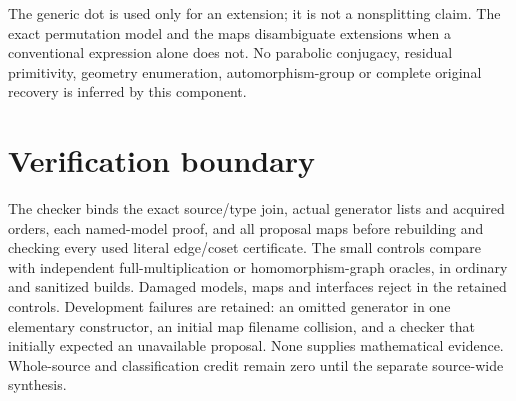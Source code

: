 \documentclass[10pt,a4paper]{article}
\begin{document}
The generic dot is used only for an extension; it is not a nonsplitting
claim. The exact permutation model and the maps disambiguate extensions
when a conventional expression alone does not. No parabolic conjugacy,
residual primitivity, geometry enumeration, automorphism-group or complete
original recovery is inferred by this component.

\section*{Verification boundary}
The checker binds the exact source/type join, actual generator
lists and acquired orders, each named-model proof, and all proposal maps
before rebuilding and checking every used literal edge/coset certificate.
The small controls compare with independent full-multiplication or
homomorphism-graph oracles, in ordinary and sanitized builds. Damaged
models, maps and interfaces reject in the retained controls. Development failures are retained:
an omitted generator in one elementary constructor, an initial map filename
collision, and a checker that initially expected an unavailable proposal.
None supplies mathematical evidence. Whole-source and classification credit
remain zero until the separate source-wide synthesis.
\end{document}
